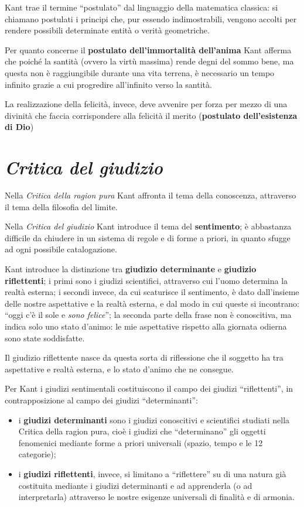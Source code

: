 \documentclass[a4paper, twoside, titlepage]{book}
\begin{document}
Kant trae il termine “postulato” dal linguaggio della matematica classica: si chiamano postulati i principi che, pur essendo indimostrabili, vengono accolti per rendere possibili determinate entità o verità geometriche.

Per quanto concerne il \textbf{postulato dell’immortalità dell’anima} Kant afferma che poiché la santità (ovvero la virtù massima) rende degni del sommo bene, ma questa non è raggiungibile durante una vita terrena, è necessario un tempo infinito grazie a cui progredire all’infinito verso la santità.

La realizzazione della felicità, invece, deve avvenire per forza per mezzo di una divinità che faccia corrispondere alla felicità il merito (\textbf{postulato dell’esistenza di Dio})

\chapter{\textit{Critica del giudizio}}

Nella \textit{Critica della ragion pura} Kant affronta il tema della conoscenza, attraverso il tema della filosofia del limite. 

Nella \textit{Critica del giudizio} Kant introduce il tema del \textbf{sentimento}; è abbastanza difficile da chiudere in un sistema di regole e di forme a priori, in quanto sfugge ad ogni possibile catalogazione.

Kant introduce la distinzione tra \textbf{giudizio determinante} e \textbf{giudizio riflettenti}; i primi sono i giudizi scientifici, attraverso cui l’uomo determina la realtà esterna; i secondi invece, da cui scaturisce il sentimento, è dato dall’insieme delle nostre aspettative e la realtà esterna, e dal modo in cui queste si incontrano: “oggi c’è il sole e \textit{sono felice}”; la seconda parte della frase non è conoscitiva, ma indica solo uno stato d’animo: le mie aspettative rispetto alla giornata odierna sono state soddisfatte.

Il giudizio riflettente nasce da questa sorta di riflessione che il soggetto ha tra aspettative e realtà esterna, e lo stato d’animo che ne consegue.

Per Kant i giudizi sentimentali costituiscono il campo dei giudizi “riflettenti”, in contrapposizione al campo dei giudizi “determinanti”:
\begin{itemize}
\item i \textbf{giudizi determinanti} sono i giudizi conoscitivi e scientifici studiati nella Critica della ragion pura, cioè i giudizi che “determinano” gli oggetti fenomenici mediante forme a priori universali (spazio, tempo e le 12 categorie);
\item i \textbf{giudizi riflettenti}, invece, si limitano a “riflettere” su di una natura già costituita mediante i giudizi determinanti e ad apprenderla (o ad interpretarla) attraverso le nostre esigenze universali di finalità e di armonia.
\end{itemize}
\end{document}
